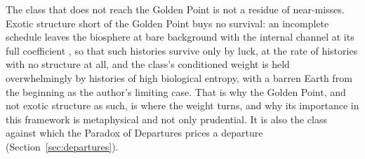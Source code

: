 \begin{remark}
The class that does not reach the Golden Point is not a residue of
near-misses. Exotic structure short of the Golden Point buys no
survival: an incomplete schedule leaves the biosphere at bare background
with the internal channel at its full coefficient
\cite{GoldenTechnoanatomy}, so that such histories survive only by luck,
at the rate of histories with no structure at all, and the class's
conditioned weight is held overwhelmingly by histories of high
biological entropy, with a barren Earth from the beginning as the
author's limiting case. That is why the Golden Point, and not exotic
structure as such, is where the weight turns, and why its importance in
this framework is metaphysical and not only prudential. It is also the
class against which the Paradox of Departures prices a departure
(Section~\ref{sec:departures}).
\end{remark}

